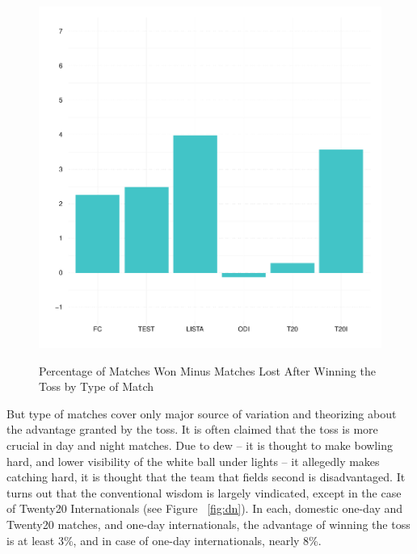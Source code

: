 \documentclass[11pt]{article}
\begin{document}
\begin{figure}[htbp]
\centering
\caption{Percentage of Matches Won Minus Matches Lost After Winning the Toss by Type of Match}
\includegraphics[scale=.85]{../figs/winbyType.pdf}
\label{fig:type}
\end{figure}

But type of matches cover only major source of variation and theorizing about the advantage granted by the toss. It is often claimed that the toss is more crucial in day and night matches. Due to dew -- it is thought to make bowling hard, and lower visibility of the white ball under lights -- it allegedly makes catching hard, it is thought that the team that fields second is disadvantaged. It turns out that the conventional wisdom is largely vindicated, except in the case of Twenty20 Internationals (see Figure ~\ref{fig:dn}). In each, domestic one-day and Twenty20 matches, and one-day internationals, the advantage of winning the toss is at least 3\%, and in case of one-day internationals, nearly 8\%.
\end{document}
